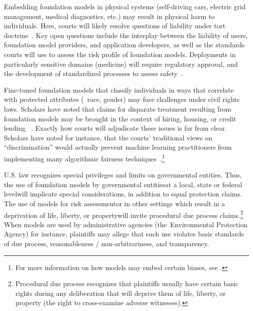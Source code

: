 Embedding foundation models in physical systems (\eg self-driving cars, electric grid management, medical diagnostics, etc.) may result in physical harm to individuals. Here, courts will likely resolve questions of liability under tort doctrine~\citep{lemley2019remedies, selbst2020negligence}. 
Key open questions include the interplay between the liability of users, foundation model providers, and application developers, as well as the standards courts will use to assess the risk profile of foundation models. Deployments in particularly sensitive domains (\eg medicine) will require regulatory approval, and the development of standardized processes to assess safety~\citep{wu2021medical}.

Fine-tuned foundation models that classify individuals in ways that correlate with protected attributes (\eg~race, gender) may face challenges under civil rights laws. Scholars have noted that claims for disparate treatment resulting from foundation models may be brought in the context of hiring, housing, or credit lending ~\citep{gillis2019big, scherer2019applying}. Exactly how courts will adjudicate these issues is far from clear.  Scholars have noted for instance, that the courts’ traditional views on ``discrimination'' would actually prevent machine learning practitioners from implementing many algorithmic fairness techniques~\citep{xiang2021reconciling, ho2020affirmative}.\footnote{For more information on how models may embed certain biases, see .} 

U.S. law recognizes special privileges and limits on governmental entities. Thus, the use of foundation models by governmental entities\dash{}at a local, state or federal level\dash{}will implicate special considerations, in addition to equal protection claims. 
The use of models for risk assessment\dash{}or in other settings which result in a deprivation of life, liberty, or property\dash{}will invite procedural due process claims.\footnote{Procedural due process recognizes that plaintiffs usually have certain basic rights during any deliberation that will deprive them of life, liberty, or property (\eg the right to cross-examine adverse witnesses).} When models are used by administrative agencies (\eg the~Environmental Protection Agency) for instance, plaintiffs may allege that such use violates basic standards of due process, reasonableness / non-arbitrariness, and transparency. 


